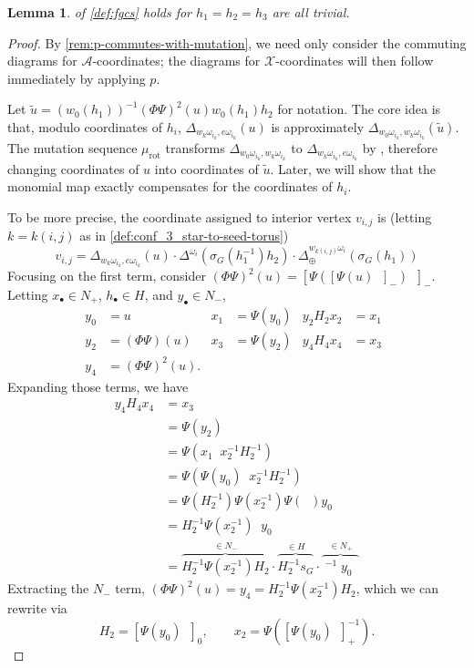 \documentclass{amsart}
\theoremstyle{plain}
\newtheorem{lemma}[theorem]{Lemma}
\theoremstyle{definition}
\theoremstyle{remark}
\newcommand{\fundamentalweight}{\omega}
\newcommand{\genminor}[2]{\Delta^{{#1} \fundamentalweight_{#2}}}
\newcommand{\genminornumerator}[2]{\Delta_{\oplus}^{{#1} {#2}}}
\newcommand{\genminoryz}[3]{\Delta_{{#1} \fundamentalweight_{#3}, {#2}%
    \fundamentalweight_{#3}}}
\newcommand{\lifttoG}[1]{{\mathop{\overline{#1}}}}
\newcommand{\TtoZ}{p}
\newcommand{\murot}{{\mu_{\text{rot}}}}
\begin{document}
  \begin{lemma}
    \label{lem:fgcs-exists-rot-works-trivial}
     of \cref{def:fgcs} holds for $h_1 = h_2 =
    h_3$ are all trivial.

  \end{lemma}
  \begin{proof}
    By \cref{rem:p-commutes-with-mutation}, we need only consider the
    commuting diagrams for $\mathcal{A}$-coordinates; the diagrams for
    $\mathcal{X}$-coordinates will then follow immediately by applying
    $\TtoZ$.

    Let $\widetilde{u} = (w_0(h_1))^{-1} (\Phi \Psi)^2(u) w_0(h_1) h_2$
    for notation. The core idea is that, modulo coordinates of $h_i$,
    $\genminoryz{w_k}{e}{i_k}(u)$ is approximately
    $\genminoryz{w_0}{w_k}{i_k}(\widetilde{u})$. The mutation sequence
    $\murot$ transforms $\genminoryz{w_0}{w_k}{i_k}$ to
    $\genminoryz{w_k}{e}{i_k}$ by
    \cite[Theorem~1.17]{fominzelevinsky1999}, therefore changing
    coordinates of $u$ into coordinates of $\widetilde{u}$. Later, we
    will show that the monomial map exactly compensates for the
    coordinates of $h_i$.

    To be more precise, the coordinate assigned to interior vertex
    $v_{i,j}$ is (letting $k = k(i,j)$ as in
    \cref{def:conf_3_star-to-seed-torus}) \[ v_{i,j} =
      \genminoryz{w_k}{e}{i_k}(u) \cdot
      \genminor{}{i}(\sigma_G(h_1^{-1}) h_2) \cdot \genminornumerator{w_{k(i,j)}}{\fundamentalweight_i}(\sigma_G(h_1))
    \] Focusing on the first term, consider $(\Phi \Psi)^2(u) = [ \Psi([
        \Psi(u) \lifttoG{w_0} ]_{-}) \lifttoG{w_0} ]_{-}$. Letting
    $x_{\bullet} \in N_{+}$, $h_{\bullet} \in H$, and $y_{\bullet} \in
    N_{-}$,
    \begin{align*}
      y_0 &= u & x_1 &= \Psi(y_0) & y_2 H_2 x_2 &= x_1 \lifttoG{w_0} \\
      y_2 &= (\Phi \Psi)(u) & x_3 &= \Psi(y_2) & y_4 H_4 x_4 &= x_3 \lifttoG{w_0} \\
      y_4 &= (\Phi \Psi)^2(u).
    \end{align*}
    Expanding those terms, we have
    \begin{align*}
      y_4 H_4 x_4 &= x_3 \lifttoG{w_0} \\
      &= \Psi(y_2) \lifttoG{w_0} \\
      &= \Psi(x_1 \lifttoG{w_0} x_2^{-1} H_2^{-1}) \lifttoG{w_0} \\
      &= \Psi(\Psi(y_0) \lifttoG{w_0} x_2^{-1} H_2^{-1}) \lifttoG{w_0} \\
      &= \Psi(H_2^{-1}) \Psi(x_2^{-1}) \Psi(\lifttoG{w_0}) y_0 \lifttoG{w_0} \\
      &= H_2^{-1} \Psi(x_2^{-1}) \lifttoG{w_0} y_0 \lifttoG{w_0} \\
      &= \overbrace{H_2^{-1} \Psi(x_2^{-1}) H_2}^{\in N_{-}} \cdot \overbrace{H_2^{-1} s_G}^{\in H} \cdot \overbrace{\lifttoG{w_0}^{-1} y_0 \lifttoG{w_0}}^{\in N_{+}}
    \end{align*}
    Extracting the $N_{-}$ term, $(\Phi \Psi)^2(u) = y_4 = H_2^{-1}
    \Psi(x_2^{-1}) H_2$, which we can rewrite via \[ H_2 = [ \Psi(y_0)
        \lifttoG{w_0} ]_{0}, \qquad x_2 = \Psi([\Psi(y_0) \lifttoG{w_0}
      ]_{+}^{-1}). \]


\end{proof}
\end{document}
